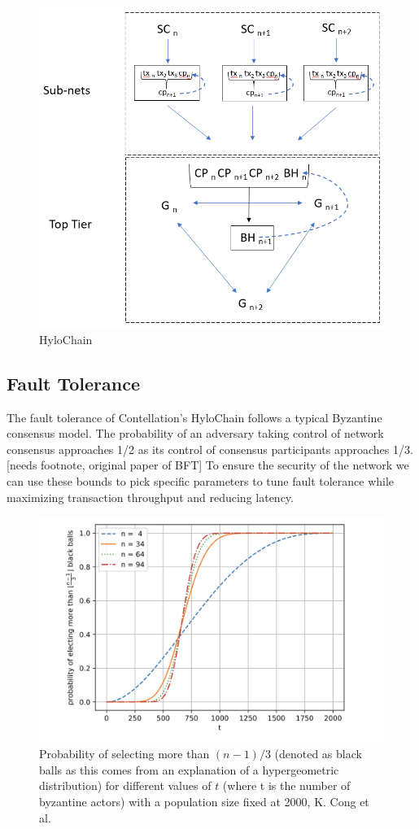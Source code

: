 \documentclass{article}
\begin{document}
\begin{figure}[H]
\centering
\includegraphics[scale=0.65]{HyloChain.png}
\caption{HyloChain}
\end{figure} 

\subsection{Fault Tolerance}
The fault tolerance of Contellation's HyloChain follows a typical Byzantine consensus model. The probability of an adversary taking control of network consensus approaches 1/2 as its control of consensus participants approaches 1/3. [needs footnote, original paper of BFT] To ensure the security of the network we can use these bounds to pick specific parameters to tune fault tolerance while maximizing transaction throughput and reducing latency. 

\begin{figure}[H]
\centering
\includegraphics[scale=0.35]{fault-threshold-vs-byz-delegates.PNG}
\caption{Probability of selecting more than $(n-1)/3$ (denoted as black balls as this comes from an explanation of a hypergeometric distribution) for different values of $t$ (where t is the number of byzantine actors) with a population size fixed at 2000, K. Cong et al.}
\end{figure} 
\end{document}
